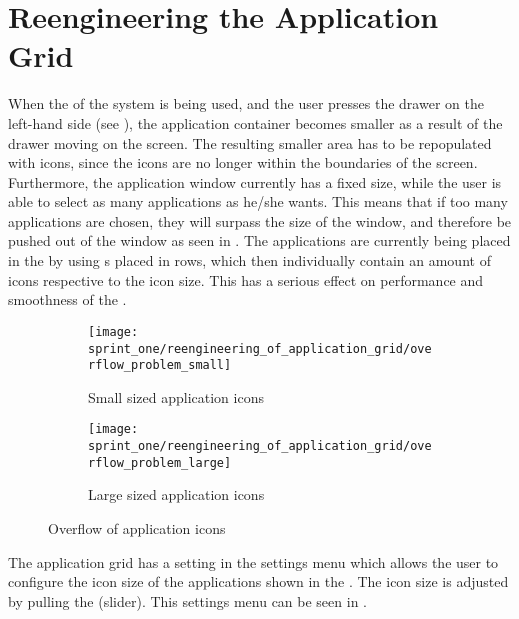 
\section{Reengineering the Application Grid}
\label{sec:reengineering_of_application_grid}

When the \launcher of the \giraf system is being used, and the user presses the drawer on the left-hand side (see ), the application container becomes smaller as a result of the drawer moving on the screen. The resulting smaller area has to be repopulated with icons, since the icons are no longer within the boundaries of the screen. Furthermore, the application window currently has a fixed size, while the user is able to select as many applications as he/she wants. This means that if too many applications are chosen, they will surpass the size of the window, and therefore be pushed out of the window as seen in . The applications are currently being placed in the \launcher by using s placed in rows, which then individually contain an amount of icons respective to the icon size. This has a serious effect on performance and smoothness of the \launcher. 

\begin{figure}[!htbp]
    \centering
    \begin{subfigure}[t]{0.3\textwidth}
        \centering
        \texttt{[image: sprint\_one/reengineering\_of\_application\_grid/overflow\_problem\_small]}
        \caption{Small sized application icons}
        \label{fig:overflow_problem_small}
    \end{subfigure}
    \hspace{5em} 
    \begin{subfigure}[t]{0.3\textwidth}
        \centering
        \texttt{[image: sprint\_one/reengineering\_of\_application\_grid/overflow\_problem\_large]}
        \caption{Large sized application icons}
        \label{fig:overflow_problem_large}
    \end{subfigure}
    
    \caption{Overflow of application icons}
    \label{fig:overflow_problem}
\end{figure}

\FloatBarrier

The application grid has a setting in the settings menu which allows the user to configure the icon size of the applications shown in the \launcher. The icon size is adjusted by pulling the  (slider). This settings menu can be seen in .

